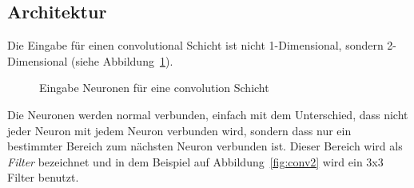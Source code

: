 \documentclass[12pt,a4paper]{report}
\begin{document}
\subsection{Architektur}
Die Eingabe für einen convolutional Schicht ist nicht 1-Dimensional, sondern 2-Dimensional (siehe Abbildung~\ref{fig:conv1}).
\begin{figure}[h]
    \centering
{}
    \caption{Eingabe Neuronen für eine convolution Schicht}
    \label{fig:conv1}
\end{figure}
Die Neuronen werden normal verbunden, einfach mit dem Unterschied, dass nicht jeder Neuron mit jedem Neuron verbunden wird,
sondern dass nur ein bestimmter Bereich zum nächsten Neuron verbunden ist.
Dieser Bereich wird als \textit{Filter} bezeichnet und in dem Beispiel auf Abbildung~\ref{fig:conv2} wird ein 3x3 Filter benutzt.
\end{document}
